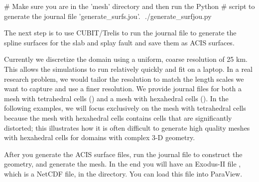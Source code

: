 \begin{shell}
# Make sure you are in the 'mesh' directory and then run the Python
# script to generate the journal file 'generate_surfs.jou'.
$$ ./generate_surfjou.py  
\end{shell}

The next step is to use CUBIT/Trelis to run the
 journal file to generate the spline
surfaces for the slab and splay fault and save them as ACIS
surfaces. 


Currently we discretize the domain using a uniform, coarse resolution
of 25 km. This allows the simulations to run relatively quickly and
fit on a laptop. In a real research problem, we would tailor the
resolution to match the length scales we want to capture and use a
finer resolution. We provide journal files for both a mesh with
tetrahedral cells () and a mesh with
hexahedral cells (). In the following
examples, we will focus exclusively on the mesh with tetrahedral cells
because the mesh with hexahedral cells contains cells that are
significantly distorted; this illustrates how it is often difficult to
generate high quality meshes with hexahedral cells for domains with
complex 3-D geometry.

After you generate the ACIS surface files, run the
 journal file to construct the geometry, and
generate the mesh. In the end you will have an Exodus-II file
, which is a NetCDF file, in the
 directory. You can load this file into ParaView.



